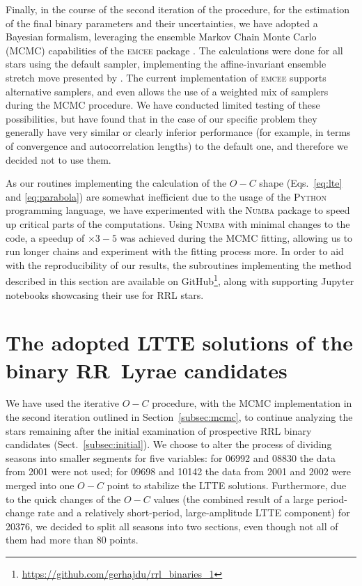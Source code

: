 \documentclass[twocolumn,times]{aastex63}
\begin{document}
Finally, in the course of the second iteration of the procedure, for the estimation of the final binary parameters and their uncertainties,
we have adopted a Bayesian formalism, leveraging the ensemble Markov Chain Monte Carlo (MCMC) capabilities of the
\textsc{emcee} package \citep{2013PASP..125..306F}. The calculations were done for all stars using the default sampler, implementing the
affine-invariant ensemble stretch move presented by \citet{2010CAMCS...5...65G}. The current implementation of \textsc{emcee} supports
alternative samplers, and even allows the use of a weighted mix of samplers during the MCMC procedure. We have conducted limited testing
of these possibilities, but have found that in the case of our specific problem they generally have very similar or clearly inferior performance
(for example, in terms of convergence and autocorrelation lengths) to the default one, and therefore we decided not to use them.

As our routines implementing the calculation of the $O-C$ shape (Eqs.~\ref{eq:lte} and \ref{eq:parabola}) are somewhat
inefficient due to the usage of the \textsc{Python} programming language, we have experimented with the \textsc{Numba} \citep{Numba}
package to speed up critical parts of the computations. Using \textsc{Numba} with minimal changes to the code, 
a speedup of $\times 3-5$ was achieved during the MCMC fitting, allowing us to run longer chains and experiment with the fitting process more.
In order to aid with the reproducibility of our results, the subroutines implementing the method described
in this section are available on GitHub\footnote{\url{https://github.com/gerhajdu/rrl_binaries_1}}, along with supporting Jupyter notebooks \citep{jupyter}
showcasing their use for RRL stars.


\section{The adopted LTTE solutions of the binary RR~Lyrae candidates} \label{sec:parameters}

We have used the iterative $O-C$ procedure, with the MCMC implementation in the second iteration outlined in Section~\ref{subsec:mcmc}, to
continue analyzing the stars remaining after the initial examination of prospective RRL binary candidates (Sect.~\ref{subsec:initial}).
We choose to alter the process of dividing seasons into smaller segments for five variables: for 06992 and 08830 the data from 2001 were
not used; for 09698 and 10142 the data from 2001 and 2002 were merged into one $O-C$ point to stabilize the LTTE solutions.
Furthermore, due to the quick changes of the $O-C$ values (the combined result of a large period-change rate and a relatively short-period,
large-amplitude LTTE component) for 20376, we decided to split all seasons into two sections, even though not all of them had more than 80 points.
\end{document}
